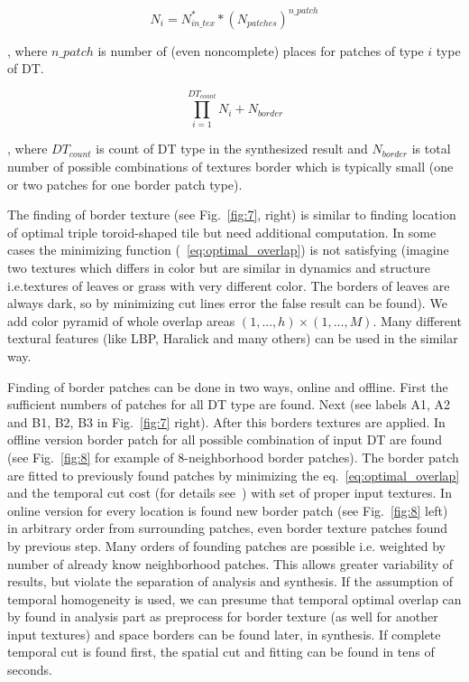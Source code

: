 \documentclass{\adsty/acmsiggraph}
\begin{document}
\begin{equation} \label{eq:num_syn3}
	N_{i} =  N_{in\_tex}^* * ( N_{patches} ) ^ {n\_patch}
\end{equation}

, where $n\_patch$ is number of (even noncomplete) places for patches of type $i$ type of DT.

\begin{equation} \label{eq:num_syn4}
	\prod\limits_{i=1}^{DT_{count}} N_{i}+ N_{border}
\end{equation}

, where  $DT_{count}$ is count of DT type in the synthesized result and  $N_{border}$ is total number of possible combinations of textures border which is typically small (one or two patches for one border patch type).

The finding of border texture (see Fig.~\ref{fig:7}, right) is similar to finding location of optimal triple toroid-shaped tile but need additional computation. 
In some cases the minimizing function (~\ref {eq:optimal_overlap}) is not satisfying (imagine two textures which differs in color but are similar in dynamics and structure i.e.textures of leaves or grass with very different color.
The borders of leaves are always dark, so by minimizing cut lines error the false result can be found). 
We add color pyramid of whole overlap areas $(1,...,h) \times (1,...,M)$. 
Many different textural features (like LBP, Haralick and many others) can be used in the similar way.

Finding of border patches can be done in two ways, online and offline. 
First the sufficient numbers of patches for all DT type are found. 
Next (see  labels A1, A2 and B1, B2, B3 in Fig.~\ref{fig:7} right). 
After this borders textures are applied. 
In offline version border patch for all possible combination of input DT are found (see Fig.~\ref{fig:8} for example of 8-neighborhood border patches). 
The border patch are fitted to previously found patches by minimizing the eq.~\ref {eq:optimal_overlap} and the temporal cut cost  (for details see~\cite{Richtr13}) with set of proper input textures. 
In online version for every location is found new border patch (see Fig.~\ref{fig:8} left) in arbitrary order from surrounding patches, even border texture patches found by previous step. 
Many orders of founding patches are possible i.e. weighted by number of already know neighborhood patches. 
This allows greater variability of results, but violate the separation of analysis and synthesis. 
If the assumption of temporal  homogeneity is used, we can presume that temporal optimal overlap can by found in analysis part as preprocess for border texture (as well for another input textures) and space borders can be found later, in synthesis. 
If complete temporal cut is found first, the spatial cut and fitting  can be found in tens of seconds.
\end{document}
